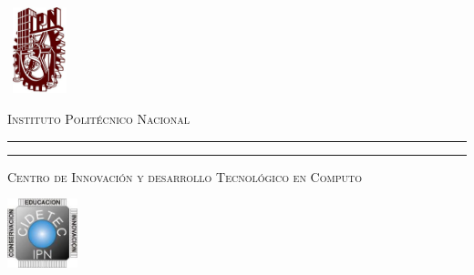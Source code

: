\documentclass[letter]{letter}
\begin{document}
	
	\thispagestyle{empty}
	
	\begin{minipage}[c][0.1\textheight][c]{0.2\textwidth}
		\begin{center}
			\includegraphics[width=1.9cm, height=2.5cm]{logo_ipn}
		\end{center}
	\end{minipage}
	\begin{minipage}[c][0.1\textheight][t]{0.6\textwidth}
		\begin{center}
			{\scshape {\Large Instituto Polit\'ecnico Nacional}}
			\vspace{.3cm}
			\hrule height2.5pt
			\vspace{.1cm}
			\hrule height1pt
			\vspace{.3cm}
			{\scshape  {\large Centro de Innovación y desarrollo Tecnológico en Computo} }
		\end{center}
	\end{minipage}
	\begin{minipage}[c][0.1\textheight][c]{0.2\textwidth}
			\begin{center}
				\includegraphics[height=2cm]{logo_cidetec}
			\end{center}
	\end{minipage}
	
	\vspace{1cm}
	
\end{document}
